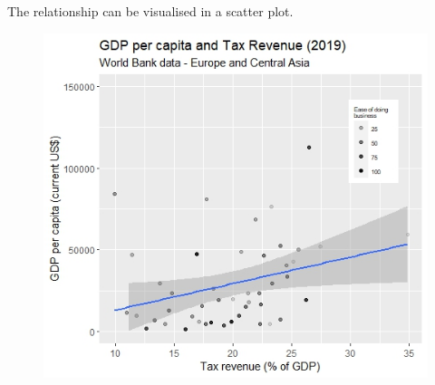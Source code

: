 \documentclass[]{report}
\begin{document}
The relationship can be visualised in a scatter plot.
\begin{figure}[b!]\centering
	\includegraphics[width=\textwidth]{Rplot01.jpeg}\\
\end{figure}
\end{document}

